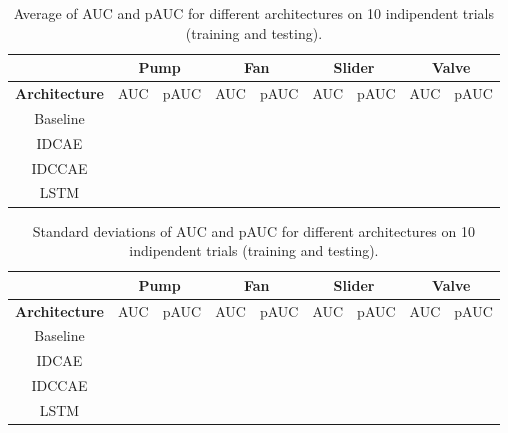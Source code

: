 \begin{table}[ht]
\centering
\begin{tabular}{|c|c|c|c|c|c|c|c|c|} 
\cline{2-9}
\multicolumn{1}{c|}{} & \multicolumn{2}{c|}{\textbf{Pump}} & \multicolumn{2}{c|}{\textbf{Fan}} & \multicolumn{2}{c|}{\textbf{Slider}} & \multicolumn{2}{c|}{\textbf{Valve}} \\ 
\hline
\textbf{Architecture} & AUC & pAUC & AUC & pAUC & AUC & pAUC & AUC & pAUC \\ 
\hline
Baseline &  &  &  &  &  &  &  &  \\ 
\hline
IDCAE &  &  &  &  &  &  &  &  \\ 
\hline
IDCCAE &  &  &  &  &  &  &  &  \\ 
\hline
LSTM &  &  &  &  &  &  &  &  \\
\hline
\end{tabular}
\caption{Average of AUC and pAUC for different architectures on 10 indipendent trials (training and testing).}
\label{datasets-average-results}
\end{table}

\begin{table}[ht]
\centering
\begin{tabular}{|c|c|c|c|c|c|c|c|c|} 
\cline{2-9}
\multicolumn{1}{c|}{} & \multicolumn{2}{c|}{\textbf{Pump}} & \multicolumn{2}{c|}{\textbf{Fan}} & \multicolumn{2}{c|}{\textbf{Slider}} & \multicolumn{2}{c|}{\textbf{Valve}} \\ 
\hline
\textbf{Architecture} & AUC & pAUC & AUC & pAUC & AUC & pAUC & AUC & pAUC \\ 
\hline
Baseline &  &  &  &  &  &  &  &  \\ 
\hline
IDCAE &  &  &  &  &  &  &  &  \\ 
\hline
IDCCAE &  &  &  &  &  &  &  &  \\ 
\hline
LSTM &  &  &  &  &  &  &  &  \\
\hline
\end{tabular}
\caption{Standard deviations of AUC and pAUC for different architectures on 10 indipendent trials (training and testing).}
\label{datasets-std-dev-results}
\end{table}

